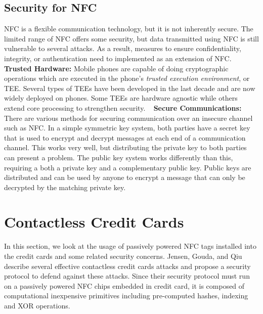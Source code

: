 \documentclass{sig-alternate}
\begin{document}
\subsection{Security for NFC}
\label{sec:backgroundSecurity}
NFC is a flexible communication technology, but it is not inherently secure. The limited range of NFC offers some security, but data transmitted using NFC is still vulnerable to several attacks. As a result, measures to ensure confidentiality, integrity, or authentication need to implemented as an extension of NFC.~\cite{CC2016}
\vspace{2mm}\newline
\noindent\textbf{Trusted Hardware:}
Mobile phones are capable of doing cryptographic operations which are executed in the phone's \textit{trusted execution environment}, or TEE. Several types of TEEs have been developed in the last decade and are now widely deployed on phones. Some TEEs are hardware agnostic while others extend core processing to strengthen security.
~\cite{Ticket2011}  
\vspace{2mm}\newline
\textbf{Secure Communications:}
There are various methods for securing communication over an insecure channel such as NFC. In a simple symmetric key system, both parties have a secret key that is used to encrypt and decrypt messages at each end of a communication channel. This works very well, but distributing the private key to both parties can present a problem. The public key system works differently than this, requiring a both a private key and a complementary public key. Public keys are distributed and can be used by anyone to encrypt a message that can only be decrypted by the matching private key.~\cite{crypto}




\section{Contactless Credit Cards}
\label{sec:creditCard}
In this section, we look at the usage of passively powered NFC tags installed into the  credit cards and some related security concerns. Jensen, Gouda, and Qiu describe several effective contactless credit cards attacks and propose a security protocol to defend against these attacks. Since their security protocol must run on a passively powered NFC chips embedded in credit card, it is composed of computational inexpensive primitives including pre-computed hashes, indexing and XOR operations.~\cite{CC2016}
\end{document}
